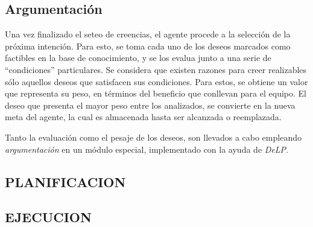 \subsection{Argumentación}
 \label{sub:argumentacion}
  
 Una vez finalizado el seteo de creencias, el agente procede a la
 selección de la próxima intención.
 Para esto, se toma cada uno de los deseos marcados como factibles en
 la base de conocimiento, y se los evalua junto a una serie de
 ``condiciones'' particulares.
 Se considera que existen razones para creer realizables sólo aquellos
 deseos que satisfacen sus condiciones.
 Para estos, se obtiene un valor que representa su peso, en términos
 del beneficio que conllevan para el equipo.
 El deseo que presenta el mayor peso entre los analizados, se convierte
 en la nueva meta del agente, la cual es almacenada hasta ser alcanzada
 o reemplazada.
 
 Tanto la evaluación como el pesaje de los deseos, son llevados a cabo
 empleando \textit{argumentación} en un módulo especial, implementado
 con la ayuda de \textit{DeLP}.
  
\subsection{PLANIFICACION}

\subsection{EJECUCION}

